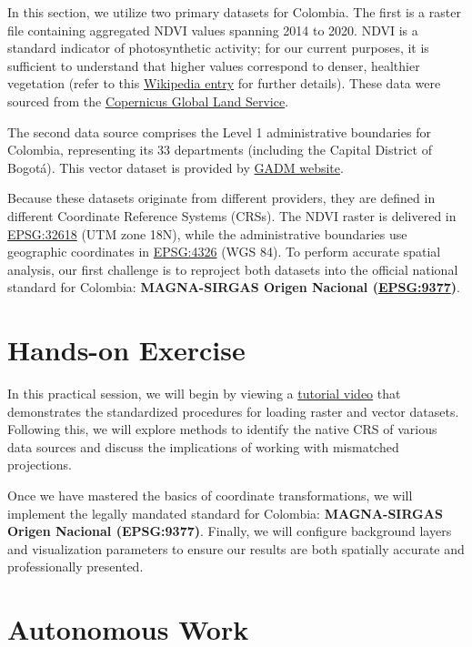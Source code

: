 \documentclass{article}
\begin{document}
In this section, we utilize two primary datasets for Colombia. The first is a raster file containing aggregated \ac{NDVI} values spanning 2014 to 2020. \ac{NDVI} is a standard indicator of photosynthetic activity; for our current purposes, it is sufficient to understand that higher values correspond to denser, healthier vegetation (refer to this \href{https://en.wikipedia.org/wiki/Normalized_difference_vegetation_index}{Wikipedia entry} for further details). These data were sourced from the \href{https://land.copernicus.eu/en/products/vegetation}{Copernicus Global Land Service}.

The second data source comprises the Level 1 administrative boundaries for Colombia, representing its 33 departments (including the Capital District of Bogotá). This vector dataset is provided by \href{https://gadm.org/}{GADM website}.

Because these datasets originate from different providers, they are defined in different Coordinate Reference Systems (CRSs). The {NDVI} raster is delivered in \href{https://epsg.io/32618}{EPSG:32618} (UTM zone 18N), while the administrative boundaries use geographic coordinates in \href{https://epsg.io/4326}{EPSG:4326} (WGS 84). To perform accurate spatial analysis, our first challenge is to reproject both datasets into the official national standard for Colombia: \textbf{MAGNA-SIRGAS Origen Nacional (\href{https://epsg.io/9377}{EPSG:9377})}.

\section{Hands-on Exercise} \label{sec:handson}

In this practical session, we will begin by viewing a \href{https://youtu.be/S4bRNDIzADI}{tutorial video} that demonstrates the standardized procedures for loading raster and vector datasets. Following this, we will explore methods to identify the native \ac{CRS} of various data sources and discuss the implications of working with mismatched projections.

Once we have mastered the basics of coordinate transformations, we will implement the legally mandated standard for Colombia: \textbf{MAGNA-SIRGAS Origen Nacional (EPSG:9377)}. Finally, we will configure background layers and visualization parameters to ensure our results are both spatially accurate and professionally presented.

\section{Autonomous Work} \label{sec:autonomous}
\end{document}
